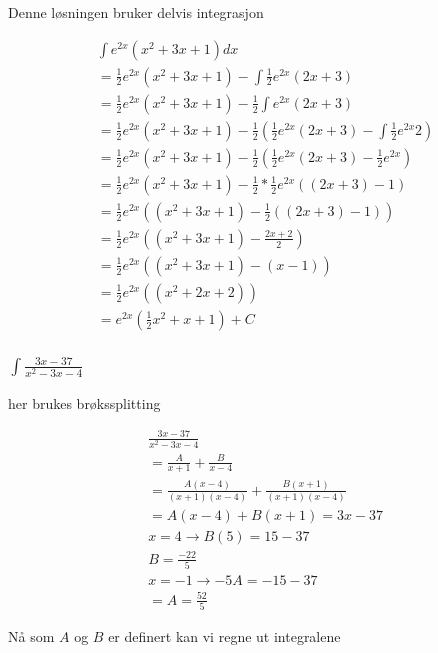 \documentclass{article}
\begin{document}
Denne løsningen bruker delvis integrasjon

\begin{align*}
    & \int e^{2x}(x^2+3x+1) dx \\ 
    &= \frac{1}{2} e^{2x} (x^2+3x+1) - \int \frac{1}{2} e^{2x} (2x+3) \\
    &= \frac{1}{2} e^{2x} (x^2+3x+1) - \frac{1}{2} \int e^{2x} (2x+3) \\
    &= \frac{1}{2} e^{2x} (x^2+3x+1) - \frac{1}{2} ( \frac{1}{2} e^{2x} (2x+3) - \int \frac{1}{2} e^{2x}2) \\
    &= \frac{1}{2} e^{2x} (x^2+3x+1) - \frac{1}{2} ( \frac{1}{2} e^{2x} (2x+3) - \frac{1}{2} e^{2x}) \\
    &= \frac{1}{2} e^{2x} (x^2+3x+1) - \frac{1}{2} * \frac{1}{2} e^{2x} ((2x+3) - 1) \\
    &= \frac{1}{2} e^{2x} ((x^2+3x+1) - \frac{1}{2} ((2x+3) - 1)) \\
    &= \frac{1}{2} e^{2x} ((x^2+3x+1) - \frac{2x+2}{2}) \\
    &= \frac{1}{2} e^{2x} ((x^2+3x+1) - (x-1)) \\
    &= \frac{1}{2} e^{2x} ((x^2+2x+2)) \\ 
    &= e^{2x} (\frac{1}{2} x^2 + x + 1) + C
\end{align*}

\subsubsection{$\int \frac{3x-37}{x^2-3x-4}$}

her brukes brøkssplitting

\begin{align*}
    & \frac{3x-37}{x^2-3x-4} \\
    &= \frac{A}{x+1} + \frac{B}{x-4} \\
    &= \frac{A(x-4)}{(x+1)(x-4)} + \frac{B(x+1)}{(x+1)(x-4)} \\
    &= A(x-4) + B(x+1) = 3x - 37 \\
    & x=4 \rightarrow B(5) = 15 - 37 \\
    & B = \frac{-22}{5} \\
    & x = -1 \rightarrow -5A = -15 -37 \\
    &= A = \frac{52}{5}
\end{align*}

Nå som $A$ og $B$ er definert kan vi regne ut integralene
\end{document}
